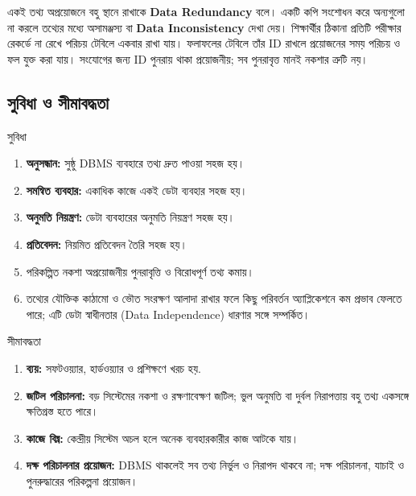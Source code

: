 একই তথ্য অপ্রয়োজনে বহু স্থানে রাখাকে \textbf{Data Redundancy} বলে। একটি কপি সংশোধন করে অন্যগুলো না করলে তথ্যের মধ্যে অসামঞ্জস্য বা \textbf{Data Inconsistency} দেখা দেয়। শিক্ষার্থীর ঠিকানা প্রতিটি পরীক্ষার রেকর্ডে না রেখে পরিচয় টেবিলে একবার রাখা যায়। ফলাফলের টেবিলে তাঁর ID রাখলে প্রয়োজনের সময় পরিচয় ও ফল যুক্ত করা যায়। সংযোগের জন্য ID পুনরায় থাকা প্রয়োজনীয়; সব পুনরাবৃত্ত মানই নকশার ত্রুটি নয়।

\subsection{সুবিধা ও সীমাবদ্ধতা}
\noindent\begin{minipage}[t]{0.485\linewidth}\vspace{0pt}
\begin{keypointbox}{সুবিধা}
\begin{enumerate}
\item \textbf{অনুসন্ধান:} সুষ্ঠু DBMS ব্যবহারে তথ্য দ্রুত পাওয়া সহজ হয়।
\item \textbf{সমন্বিত ব্যবহার:} একাধিক কাজে একই ডেটা ব্যবহার সহজ হয়।
\item \textbf{অনুমতি নিয়ন্ত্রণ:} ডেটা ব্যবহারের অনুমতি নিয়ন্ত্রণ সহজ হয়।
\item \textbf{প্রতিবেদন:} নিয়মিত প্রতিবেদন তৈরি সহজ হয়।
\item পরিকল্পিত নকশা অপ্রয়োজনীয় পুনরাবৃত্তি ও বিরোধপূর্ণ তথ্য কমায়।
\item তথ্যের যৌক্তিক কাঠামো ও ভৌত সংরক্ষণ আলাদা রাখার ফলে কিছু পরিবর্তন অ্যাপ্লিকেশনে কম প্রভাব ফেলতে পারে; এটি ডেটা স্বাধীনতার (Data Independence) ধারণার সঙ্গে সম্পর্কিত।
\end{enumerate}
\end{keypointbox}\end{minipage}\hfill
\begin{minipage}[t]{0.485\linewidth}\vspace{0pt}\begin{mistakebox}{সীমাবদ্ধতা}
\begin{enumerate}
\item \textbf{ব্যয়:} সফটওয়্যার, হার্ডওয়্যার ও প্রশিক্ষণে খরচ হয়.
\item \textbf{জটিল পরিচালনা:} বড় সিস্টেমের নকশা ও রক্ষণাবেক্ষণ জটিল; ভুল অনুমতি বা দুর্বল নিরাপত্তায় বহু তথ্য একসঙ্গে ক্ষতিগ্রস্ত হতে পারে।
\item \textbf{কাজে বিঘ্ন:} কেন্দ্রীয় সিস্টেম অচল হলে অনেক ব্যবহারকারীর কাজ আটকে যায়।
\item \textbf{দক্ষ পরিচালনার প্রয়োজন:} DBMS থাকলেই সব তথ্য নির্ভুল ও নিরাপদ থাকবে না; দক্ষ পরিচালনা, যাচাই ও পুনরুদ্ধারের পরিকল্পনা প্রয়োজন।
\end{enumerate}
\end{mistakebox}\end{minipage}

